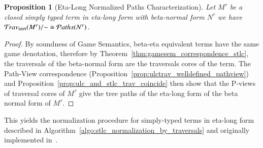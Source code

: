 \documentclass{elsarticle}
\theoremstyle{plain}
\newtheorem{proposition}[theorem]{Proposition}
\theoremstyle{definition}
\newcommand{\concrete}{{\sf con}}
\newcommand{\travsetcon}{{\travset_\concrete}} %
\def\structisomorphic{\cong} %
\newcommand\pathset{{\mathcal{P}aths}} %
\begin{document}


\begin{proposition}[Eta-Long Normalized Paths Characterization]
\label{prop:path_charact_stlc}
Let $M^\tau$ be a closed simply typed term
in eta-long form with beta-normal form $N^\tau$
we have $\travsetcon(M^\tau)/{\sim} \structisomorphic \pathset(N^\tau)$.
\end{proposition}
\begin{proof}
 By soundness of Game Semantics, beta-eta equivalent terms have the same game denotation, therefore by Theorem~\ref{thm:gamesem_correspondence_stlc}, the traversals of the beta-normal form are the traversals cores of the term. The Path-View correspondence (Proposition~\ref{prop:ulctrav_welldefined_pathview}) and Proposition~\ref{prop:ulc_and_stlc_trav_coincide} then show that the P-views of traversal cores of $M^\tau$ give the tree paths of the eta-long form of the beta normal form of $M^\tau$.
\end{proof}

This yields the normalization procedure for simply-typed terms in eta-long form described in Algorithm~\ref{algo:stlc_normalization_by_traversals} and originally implemented in~\cite{BlumGalop2008, Blum-HogTool}.
\end{document}
